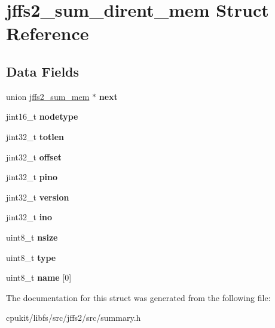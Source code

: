 \hypertarget{structjffs2__sum__dirent__mem}{}\section{jffs2\+\_\+sum\+\_\+dirent\+\_\+mem Struct Reference}
\label{structjffs2__sum__dirent__mem}
\subsection*{Data Fields}
\begin{DoxyCompactItemize}
\item 
\mbox{\label{structjffs2__sum__dirent__mem_adc107c691d8d27c63db75077d6a853c9}} 
union \mbox{\hyperlink{unionjffs2__sum__mem}{jffs2\+\_\+sum\+\_\+mem}} $\ast$ {\bfseries next}
\item 
\mbox{\label{structjffs2__sum__dirent__mem_a14d7513c175efe6d9fb2e569cec7f6ca}} 
jint16\+\_\+t {\bfseries nodetype}
\item 
\mbox{\label{structjffs2__sum__dirent__mem_a990baa2d3f08a99eb7c5dffa9d23fa37}} 
jint32\+\_\+t {\bfseries totlen}
\item 
\mbox{\label{structjffs2__sum__dirent__mem_afdd5607e661906b2f02f16e35227d449}} 
jint32\+\_\+t {\bfseries offset}
\item 
\mbox{\label{structjffs2__sum__dirent__mem_a111e38af664d474548e07f6da28ca43a}} 
jint32\+\_\+t {\bfseries pino}
\item 
\mbox{\label{structjffs2__sum__dirent__mem_a89eb077983b6aeffab8bcbeb8d06c3f2}} 
jint32\+\_\+t {\bfseries version}
\item 
\mbox{\label{structjffs2__sum__dirent__mem_a15ab589e2f288efb1272ba31514e5b0b}} 
jint32\+\_\+t {\bfseries ino}
\item 
\mbox{\label{structjffs2__sum__dirent__mem_aae997cd2719baec89f62fe2ef0bee87b}} 
uint8\+\_\+t {\bfseries nsize}
\item 
\mbox{\label{structjffs2__sum__dirent__mem_a4200e4e1fcaf941a0aa23509b71b8385}} 
uint8\+\_\+t {\bfseries type}
\item 
\mbox{\label{structjffs2__sum__dirent__mem_ad4255484fb5173389521e2ea7f5a12b1}} 
uint8\+\_\+t {\bfseries name} \mbox{[}0\mbox{]}
\end{DoxyCompactItemize}


The documentation for this struct was generated from the following file\+:\begin{DoxyCompactItemize}
\item 
cpukit/libfs/src/jffs2/src/summary.\+h\end{DoxyCompactItemize}
